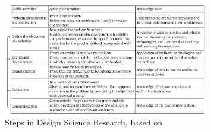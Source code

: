 \documentclass[a4paper,twoside,10pt]{report}
\begin{document}
\begin{figure}[h]
	\centering
  \includegraphics[width=0.8\textwidth]{Figure/process.jpg}
  \caption{Steps in Design Science Research, based on \cite{Geerts2011142}}
  \label{fig:DSR_steps}
\end{figure}
\end{document}
